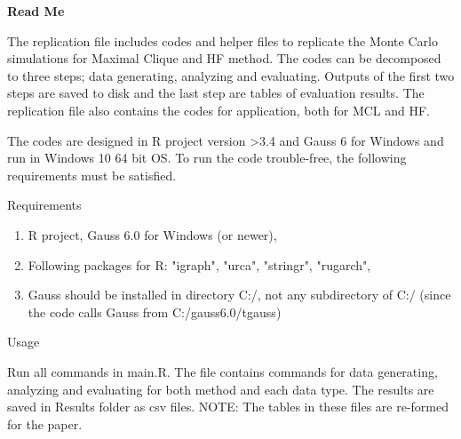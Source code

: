 \documentclass{article}
\begin{document}
\begin{center}
	\Large \bf Read Me 
\end{center}
The replication file includes codes and helper files to replicate the Monte Carlo simulations for Maximal Clique and HF method. The codes can be decomposed to three steps; data generating, analyzing and evaluating. Outputs of the first two steps are saved to disk and the last step are tables of evaluation results. The replication file also contains the codes for application, both for MCL and HF.

The codes are designed in R project version >3.4 and Gauss 6 for Windows and run in Windows 10 64 bit OS. To run the code trouble-free, the following requirements must be satisfied.
\begin{flushleft}
	\large Requirements
\end{flushleft}
\begin{enumerate}
\item R project, Gauss 6.0 for Windows (or newer),
\item Following packages for R: "igraph", "urca", "stringr", "rugarch",
\item Gauss should be installed in directory C:/, not any subdirectory of C:/ (since the code calls Gauss from C:/gauss6.0/tgauss)

\end{enumerate}

\begin{flushleft}
	\large Usage
\end{flushleft}
Run all commands in main.R. The file contains commands for data generating, analyzing and evaluating for both method and each data type. The results are saved in Results folder as csv files. NOTE: The tables in these files are re-formed for the paper.
\end{document}
